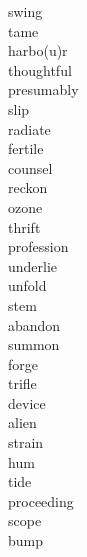 \documentclass[b5paper, 11pt]{ctexart}
\begin{document}
\begin{multicols*}{3}
\begin{description}
\item[swing]

\item[tame]

\item[harbo(u)r]

\item[thoughtful]

\item[presumably]

\item[slip]

\item[radiate]

\item[fertile]

\item[counsel]

\item[reckon]

\item[ozone]

\item[thrift]

\item[profession]

\item[underlie]

\item[unfold]

\item[stem]

\item[abandon]

\item[summon]

\item[forge]

\item[trifle]

\item[device]

\item[alien]

\item[strain]

\item[hum]

\item[tide]

\item[proceeding]

\item[scope]

\item[bump]


\end{description}
\end{multicols*}
\end{document}
